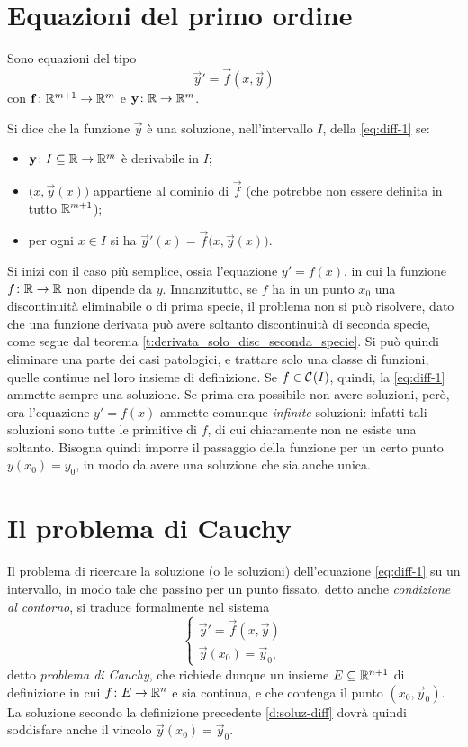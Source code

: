 \section{Equazioni del primo ordine}
Sono equazioni del tipo
\begin{equation} \label{eq:diff-1}
\vec y'=\vec f(x,\vec y)
\end{equation}
con $\mathbf{f}\colon\mathbb{R}^{m+1}\to\mathbb{R}^m$ e $\mathbf{y}\colon\mathbb{R}\to\mathbb{R}^m$.
\begin{definizione} \label{d:soluz-diff}
Si dice che la funzione $\vec y$ è una soluzione, nell'intervallo $I$, della \eqref{eq:diff-1} se:
\begin{itemize}
\item$\mathbf{y}\colon I\subseteq\mathbb{R}\to\mathbb{R}^m$ è derivabile in $I$;
\item$\big(x,\vec y(x)\big)$ appartiene al dominio di $\vec f$ (che potrebbe non essere definita in tutto $\mathbb{R}^{m+1}$);
\item per ogni $x\in I$ si ha $\vec y'(x)=\vec f\big(x,\vec y(x)\big)$.
\end{itemize}
\end{definizione}
Si inizi con il caso più semplice, ossia l'equazione $y'=f(x)$, in cui la funzione $f\colon\mathbb{R}\to\mathbb{R}$ non dipende da $y$. Innanzitutto, se $f$ ha in un punto $x_0$ una discontinuità eliminabile o di prima specie, il problema non si può risolvere, dato che una funzione derivata può avere soltanto discontinuità di seconda specie, come segue dal teorema \ref{t:derivata_solo_disc_seconda_specie}.
Si può quindi eliminare una parte dei casi patologici, e trattare solo una classe di funzioni, quelle continue nel loro insieme di definizione. Se $f\in\mathcal{C}^{{}}(I)$, quindi, la \eqref{eq:diff-1} ammette sempre una soluzione. Se prima era possibile non avere soluzioni, però, ora l'equazione $y'=f(x)$ ammette comunque \emph{infinite} soluzioni: infatti tali soluzioni sono tutte le primitive di $f$, di cui chiaramente non ne esiste una soltanto. Bisogna quindi imporre il passaggio della funzione per un certo punto $y(x_0)=y_0$, in modo da avere una soluzione che sia anche unica.

\section{Il problema di Cauchy}
Il problema di ricercare la soluzione (o le soluzioni) dell'equazione \eqref{eq:diff-1} su un intervallo, in modo tale che passino per un punto fissato, detto anche \emph{condizione al contorno}, si traduce formalmente nel sistema
\begin{equation} \label{pc}
\begin{cases}
\vec y'=\vec f(x,\vec y)\\\vec y(x_0)=\vec y_0,
\end{cases}
\end{equation}
detto \emph{problema di Cauchy}, che richiede dunque un insieme $E\subseteq\mathbb{R}^{n+1}$ di definizione in cui $f\colon E\to\mathbb{R}^n$ e sia continua, e che contenga il punto $(x_0,\vec y_0)$. La soluzione secondo la definizione precedente \ref{d:soluz-diff} dovrà quindi soddisfare anche il vincolo $\vec y(x_0)=\vec y_0$.

